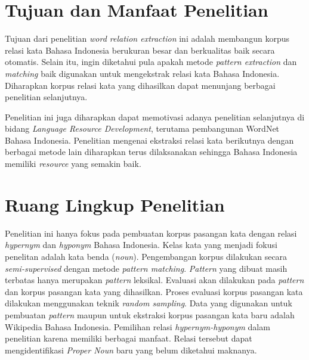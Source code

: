 \section{Tujuan dan Manfaat Penelitian}
Tujuan dari penelitian \textit{word relation extraction} ini adalah membangun korpus relasi kata Bahasa Indonesia berukuran besar dan berkualitas baik secara otomatis. Selain itu, ingin diketahui pula apakah metode \textit{pattern extraction} dan \textit{matching} baik digunakan untuk mengekstrak relasi kata Bahasa Indonesia. Diharapkan korpus relasi kata yang dihasilkan dapat menunjang berbagai penelitian selanjutnya.
 
Penelitian ini juga diharapkan dapat memotivasi adanya penelitian selanjutnya di bidang \textit{Language Resource Development}, terutama pembangunan WordNet Bahasa Indonesia. Penelitian mengenai ekstraksi relasi kata berikutnya dengan berbagai metode lain diharapkan terus dilaksanakan sehingga Bahasa Indonesia memiliki \textit{resource} yang semakin baik.

\section{Ruang Lingkup Penelitian}
Penelitian ini hanya fokus pada pembuatan korpus pasangan kata dengan relasi \textit{hypernym} dan \textit{hyponym} Bahasa Indonesia. Kelas kata yang menjadi fokusi penelitan adalah kata benda (\textit{noun}). Pengembangan korpus dilakukan secara \textit{semi-supervised} dengan metode \textit{pattern matching}. \textit{Pattern} yang dibuat masih terbatas hanya merupakan \textit{pattern} leksikal. Evaluasi akan dilakukan pada \textit{pattern} dan korpus pasangan kata yang dihasilkan. Proses evaluasi korpus pasangan kata dilakukan menggunakan teknik \textit{random sampling}. Data yang digunakan untuk pembuatan \textit{pattern} maupun untuk ekstraksi korpus pasangan kata baru adalah Wikipedia Bahasa Indonesia. 
Pemilihan relasi \textit{hypernym-hyponym} dalam penelitian karena memiliki berbagai manfaat. Relasi tersebut dapat mengidentifikasi \textit{Proper Noun} baru yang belum diketahui maknanya.

